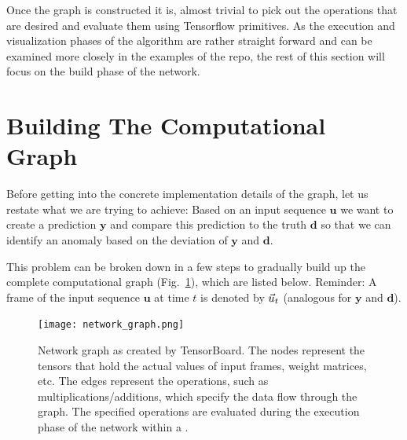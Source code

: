 Once the graph is constructed it is, almost trivial to pick out the operations
that are desired and evaluate them using Tensorflow primitives. As the
execution and visualization phases of the algorithm are rather straight forward
and can be examined more closely in the examples of the  repo, the
rest of this section will focus on the build phase of the network. 


\section{Building The Computational Graph}%
\label{sec:building_the_computational_graph}

Before getting into the concrete implementation details of the graph, let us
restate what we are trying to achieve:  Based on an input sequence $\mathbf{u}$
we want to create a prediction $\mathbf{y}$ and compare this prediction to the
truth $\mathbf{d}$ so that we can identify an anomaly based on the deviation of
$\mathbf{y}$ and $\mathbf{d}$. 

This problem can be broken down in a few steps to gradually build up the
complete computational graph (Fig.~\ref{fig:network_graph}), which are listed
below.  Reminder: A frame of the input sequence $\mathbf{u}$ at time $t$ is
denoted by $\vec{u}_t$ (analogous for $\mathbf{y}$ and $\mathbf{d}$).

\begin{figure}
  \centering
  \texttt{[image: network\_graph.png]}
  \caption{Network graph as created by TensorBoard. The nodes represent the
  tensors that hold the actual values of input frames, weight matrices, etc.
  The edges represent the operations, such as multiplications/additions, which
  specify the data flow through the graph. The specified operations are evaluated
  during the execution phase of the network within a .}
  \label{fig:network_graph}
\end{figure}


